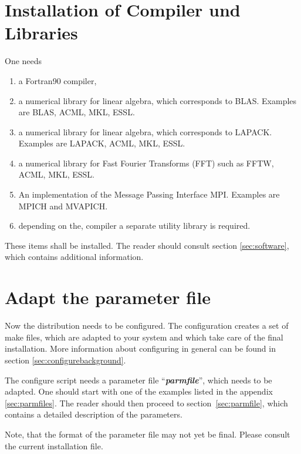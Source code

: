 \documentclass[a4paper,10pt]{report}
\newcommand{\myspec}[1]{\textbf{\textit{#1}}}
\begin{document}
\section{Installation of Compiler und Libraries}
One needs
\begin{enumerate}
\item a Fortran90 compiler, 
\item a numerical library for linear algebra, which corresponds to
BLAS. Examples are BLAS, ACML, MKL, ESSL.
\item a numerical library for linear algebra, which corresponds to
LAPACK. Examples are LAPACK, ACML, MKL, ESSL.
\item a numerical library for Fast Fourier Transforms (FFT) such as
FFTW, ACML, MKL, ESSL.
\item An implementation of the Message Passing Interface
MPI. Examples are MPICH
and MVAPICH.
\item depending on the, compiler a separate utility library is required.
\end{enumerate}
These items shall be installed. The reader should consult section
\ref{sec:software}, which contains additional information.

\section{Adapt the parameter file}
Now the distribution needs to be configured. The configuration
creates a set of make files, which are adapted to your system and
which take care of the final installation. More information about
configuring in general can be found in section
\ref{sec:configurebackground}.

The configure script needs a parameter file
``\myspec{parmfile}'', which
needs to be adapted. One should start with one of the examples listed
in the appendix \ref{sec:parmfiles}. The reader should then proceed to
section~\ref{sec:parmfile}, which contains a detailed description of
the parameters.

Note, that the format of the parameter file may not yet be final. Please
consult the current installation file.
\end{document}
